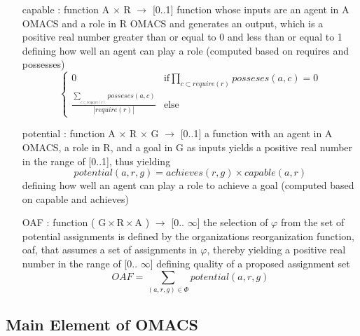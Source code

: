 \begin{itemize}
\newcommand{\localtextbulletone}{\textcolor{gray}{\raisebox{.45ex}{\rule{.6ex}{.6ex}}}}
\renewcommand{\labelitemi}{\localtextbulletone}
\item[capable]   
: function A $\times$ R $\rightarrow$ {[}0..1{]} function whose inputs are an agent in A OMACS
and a role in R OMACS and generates an output, which is a positive real number greater than or equal to 0 
and less than or equal to 1
defining how well an agent can play a role (computed based on requires and possesses)
\begin{equation}
\begin{cases}
0 & \textrm{if}\prod_{c\subset require(r)}posseses(a,c)=0\\
\frac{\sum_{_{c\subset require(r)}}posseses(a,c) }{|require(r)|} & \textrm{else}
\end{cases}\label{eq:capable equation}
\end{equation}

\item[potential]
: function A $\times$ R $\times$ G $\rightarrow$ {[}0..1{]}  a function with an agent in A OMACS,
a role in R, and a goal in G as inputs yields a positive real number in the range of {[}0..1{]}, 
thus yielding	
\begin{equation}
potential(a,r,g)=achieves(r,g)\times capable(a,r) \label{eq:potential equation}
\end{equation}
defining how well an agent can play a role to achieve a goal (computed based on capable and achieves)

\item[ OAF ] 
: function ( $ \textrm{G} \times \textrm{R}  \times \textrm{A} $ )  $\rightarrow$ {[}0.. $\infty${]} 
the selection of $\varphi$ from the set of potential assignments is defined by the organizations reorganization function,
 oaf, that assumes a set of assignments in $\varphi$,
thereby yielding a positive real number in the range of {[}0.. $\infty${]}
defining quality of a proposed assignment set
\begin{equation}
OAF=\sum_{(a,r,g)\in\varPhi}potential(a,r,g)\label{eq:oaf equation}
\end{equation}


\end{itemize}

\subsection{Main Element of OMACS}


